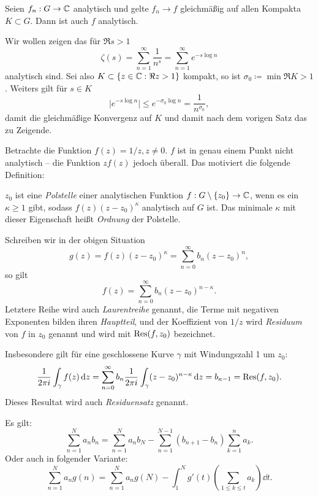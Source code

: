 \begin{theorem}
    Seien $f_n : G \to \mathbb{C}$ analytisch und gelte $f_n \to f$ gleichmäßig auf allen Kompakta $K \subset G$. Dann ist auch $f$ analytisch.
\end{theorem}

\begin{remark}
    Wir wollen zeigen das für $\Re s > 1$
    $$ \zeta(s) = \sum_{n=1}^\infty \frac{1}{n^s} = \sum_{n=1}^\infty e^{-s \log n} $$
    analytisch sind. Sei also $K \subset \{ z \in \mathbb{C} : \Re z > 1 \}$ kompakt, so ist $\sigma_0 \coloneqq \min \Re K > 1$. Weiters gilt für $s \in K$
    $$ \vert e^{-s \log n} \vert \leq e^{-\sigma_0 \log n} = \frac{1}{n^{\sigma_0}}, $$
    damit die gleichmäßige Konvergenz auf $K$ und damit nach dem vorigen Satz das zu Zeigende.
\end{remark}

\begin{example}
    Betrachte die Funktion $f(z) = 1/z, z \neq 0$. $f$ ist in genau einem Punkt nicht analytisch -- die Funktion $z f(z)$ jedoch überall. Das motiviert die folgende Definition:
\end{example}

\begin{definition}
    $z_0$ ist eine \emph{Polstelle} einer analytischen Funktion $f : G \setminus \{ z_0 \} \to \mathbb{C}$, wenn es ein $\kappa \geq 1$ gibt, sodass
    $ f(z) (z-z_0)^\kappa $ analytisch auf $G$ ist. Das minimale $\kappa$ mit dieser Eigenschaft heißt \emph{Ordnung} der Polstelle.
\end{definition}

\begin{remark}
    Schreiben wir in der obigen Situation
    $$ g(z) = f(z) (z-z_0)^\kappa = \sum_{n=0}^\infty b_n (z-z_0)^n, $$
    so gilt
    $$ f(z) = \sum_{n=0}^\infty b_n (z-z_0)^{n-\kappa}. $$
    Letztere Reihe wird auch \emph{Laurentreihe} genannt, die Terme mit negativen Exponenten bilden ihren \emph{Hauptteil}, und der Koeffizient von $1/z$ wird \emph{Residuum} von $f$ in $z_0$ genannt und wird mit $\operatorname*{Res}(f, z_0)$ bezeichnet.

    Insbesondere gilt für eine geschlossene Kurve $\gamma$ mit Windungszahl 1 um $z_0$:
    $$ \frac{1}{2 \pi i} \int_\gamma f(z) \mathop{}\!\mathrm{d} z = \sum_{n=0}^\infty b_n \frac{1}{2 \pi i} \int_\gamma (z - z_0)^{n-\kappa} \mathop{}\!\mathrm{d} z = b_{\kappa - 1} = \operatorname*{Res}(f, z_0). $$
    Dieses Resultat wird auch \emph{Residuensatz} genannt.
\end{remark}

\begin{theorem} Es gilt:
    $$ \sum_{n=1}^N a_n b_n = \sum_{n=1}^N a_n b_N - \sum_{n=1}^{N-1} (b_{n+1} - b_n) \sum_{k=1}^n a_k. $$
    Oder auch in folgender Variante:
    $$ \sum_{n=1}^N a_n g(n) = \sum_{n=1}^N a_n g(N) - \int_1^N g'(t) \left( \sum_{1 \leq k \leq t} a_k \right) \dd t. $$
\end{theorem}


